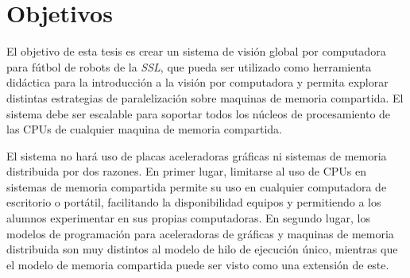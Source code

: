 
\section{Objetivos}

\label{objetivos}

El objetivo de esta tesis es crear un sistema de visión global por computadora
para fútbol de robots de la \emph{SSL}, que pueda ser utilizado como herramienta
didáctica para la introducción a la visión por computadora y permita explorar
distintas estrategias de paralelización sobre maquinas de memoria compartida. El
sistema debe ser escalable para soportar todos los núcleos de procesamiento de
las CPUs de cualquier maquina de memoria compartida.

El sistema no hará uso de placas aceleradoras gráficas ni sistemas de memoria distribuida
por dos razones. En primer lugar, limitarse al uso de CPUs en sistemas de
memoria compartida permite su uso en cualquier computadora de escritorio o
portátil, facilitando la disponibilidad equipos y permitiendo a los alumnos
experimentar en sus propias computadoras. En segundo lugar, los modelos de
programación para aceleradoras de gráficas y maquinas de memoria distribuida son
muy distintos al modelo de hilo de ejecución único, mientras que el modelo de
memoria compartida puede ser visto como una extensión de este.
